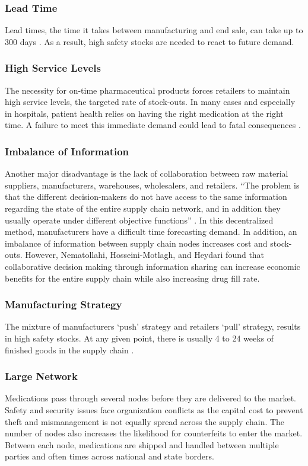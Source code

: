 \documentclass[sigconf]{acmart}
\begin{document}
\subsubsection{Lead Time} Lead times, the time it takes between manufacturing and end sale, can take up to 300 days \cite{Shah01}. As a result, high safety stocks are needed to react to future demand.
\subsubsection{High Service Levels} The necessity for on-time pharmaceutical products forces retailers to maintain high service levels, the targeted rate of stock-outs. In many cases and especially in hospitals, patient health relies on having the right medication at the right time. A failure to meet this immediate demand could lead to fatal consequences \cite{Kelle01} \cite{Hua01}.
\subsubsection{Imbalance of Information} Another major disadvantage is the lack of collaboration between raw material suppliers, manufacturers, warehouses, wholesalers, and retailers. ``The problem is that the different decision-makers do not have access to the same information regarding the state of the entire supply chain network, and in addition they usually operate under different objective functions'' \cite{Sahay01}. In this decentralized method, manufacturers have a difficult time forecasting demand. In addition, an imbalance of information between supply chain nodes increases cost and stock-outs. However, Nematollahi, Hosseini-Motlagh, and Heydari \cite{Nematollahi01} found that collaborative decision making through information sharing can increase economic benefits for the entire supply chain while also increasing drug fill rate.
\subsubsection{Manufacturing Strategy} The mixture of manufacturers `push' strategy and retailers `pull' strategy, results in high safety stocks. At any given point, there is usually 4 to 24 weeks of finished goods in the supply chain  \cite{Shah01}. 
\subsubsection{Large Network} Medications pass through several nodes before they are delivered to the market. Safety and security issues face organization conflicts as the capital cost to prevent theft and mismanagement is not equally spread across the supply chain. The number of nodes also increases the likelihood for counterfeits to enter the market. Between each node, medications are shipped and handled between multiple parties and often times across national and state borders.
\end{document}
